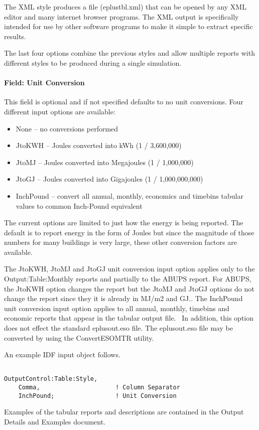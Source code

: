 The XML style produces a file (eplustbl.xml) that can be opened by any XML editor and many internet browser programs. The XML output is specifically intended for use by other software programs to make it simple to extract specific results.

The last four options combine the previous styles and allow multiple reports with different styles to be produced during a single simulation.

\paragraph{Field: Unit Conversion}\label{field-unit-conversion}

This field is optional and if not specified defaults to no unit conversions. Four different input options are available:

\begin{itemize}
\item
  None -- no conversions performed
\item
  JtoKWH -- Joules converted into kWh (1 / 3,600,000)
\item
  JtoMJ -- Joules converted into Megajoules (1 / 1,000,000)
\item
  JtoGJ -- Joules converted into Gigajoules (1 / 1,000,000,000)
\item
  InchPound -- convert all annual, monthly, economics and timebins tabular values to common Inch-Pound equivalent
\end{itemize}

The current options are limited to just how the energy is being reported. The default is to report energy in the form of Joules but since the magnitude of those numbers for many buildings is very large, these other conversion factors are available.

The JtoKWH, JtoMJ and JtoGJ unit conversion input option applies only to the Output:Table:Monthly reports and partially to the ABUPS report. For ABUPS, the JtoKWH option changes the report but the JtoMJ and JtoGJ options do not change the report since they it is already in MJ/m2 and GJ.. The InchPound unit conversion input option applies to all annual, monthly, timebins and economic reports that appear in the tabular output file.~ In addition, this option does not effect the standard eplusout.eso file. The eplusout.eso file may be converted by using the ConvertESOMTR utility.

An example IDF input object follows.

\begin{lstlisting}

OutputControl:Table:Style,
    Comma,                     ! Column Separator
    InchPound;                 ! Unit Conversion
\end{lstlisting}

Examples of the tabular reports and descriptions are contained in the Output Details and Examples document.

